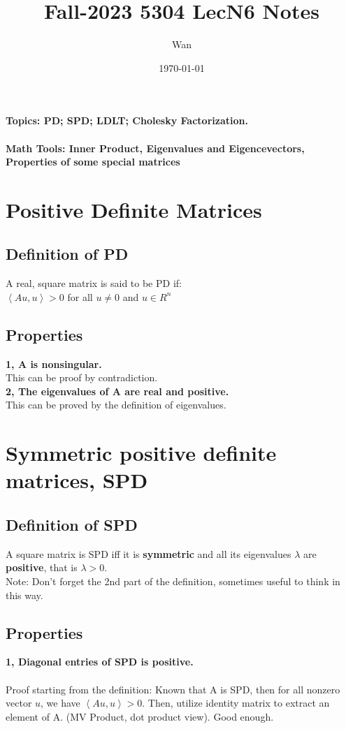 \documentclass{article}
\begin{document}
\title{Fall-2023 5304 LecN6 Notes}
\author{Wan}
\date{\today}
\maketitle

\noindent
\textbf{Topics: PD; SPD; LDLT; Cholesky Factorization.}\\
\\
\textbf{Math Tools: Inner Product, Eigenvalues and Eigencevectors, Properties of some special matrices}

\section{Positive Definite Matrices}

\subsection*{Definition of PD}
A real, square matrix is said to be PD if:\\
$\left\langle Au,u\right\rangle > 0$ for all $u \neq 0$ and $u \in R^n$

\subsection{Properties}
\textbf{1, A is nonsingular.}\\
This can be proof by contradiction.\\

\noindent
\textbf{2, The eigenvalues of A are real and positive.}\\
This can be proved by the definition of eigenvalues.\\

\pagebreak
\section{Symmetric positive definite matrices, SPD}
\subsection{Definition of SPD}
A square matrix is SPD
iff it is \textbf{symmetric} and all its eigenvalues $\lambda$ are \textbf{positive},
that is $\lambda > 0$.\\
Note: Don't forget the 2nd part of the definition, sometimes useful to think in this way.\\

\subsection*{Properties}
\textbf{1, Diagonal entries of SPD is positive.}\\
\\
Proof starting from the definition: Known that A is SPD, then
for all nonzero vector $u$, we have $\left\langle Au,u\right\rangle > 0$.
\noindent
Then, utilize identity matrix to extract an element of A. (MV Product, dot product view). Good enough.\\
\end{document}
